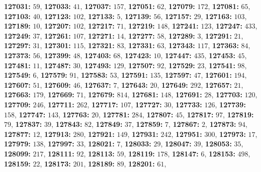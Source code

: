 \textsf{\bfseries 127031:} $59$, \textsf{\bfseries 127033:} $41$, \textsf{\bfseries 127037:} $157$, \textsf{\bfseries 127051:} $62$, \textsf{\bfseries 127079:} $172$, \textsf{\bfseries 127081:} $65$, \textsf{\bfseries 127103:} $40$, \textsf{\bfseries 127123:} $102$, \textsf{\bfseries 127133:} $5$, \textsf{\bfseries 127139:} $56$, \textsf{\bfseries 127157:} $29$, \textsf{\bfseries 127163:} $103$, \textsf{\bfseries 127189:} $10$, \textsf{\bfseries 127207:} $102$, \textsf{\bfseries 127217:} $71$, \textsf{\bfseries 127219:} $148$, \textsf{\bfseries 127241:} $123$, \textsf{\bfseries 127247:} $433$, \textsf{\bfseries 127249:} $37$, \textsf{\bfseries 127261:} $107$, \textsf{\bfseries 127271:} $14$, \textsf{\bfseries 127277:} $58$, \textsf{\bfseries 127289:} $3$, \textsf{\bfseries 127291:} $21$, \textsf{\bfseries 127297:} $31$, \textsf{\bfseries 127301:} $115$, \textsf{\bfseries 127321:} $83$, \textsf{\bfseries 127331:} $63$, \textsf{\bfseries 127343:} $117$, \textsf{\bfseries 127363:} $84$, \textsf{\bfseries 127373:} $56$, \textsf{\bfseries 127399:} $48$, \textsf{\bfseries 127403:} $68$, \textsf{\bfseries 127423:} $10$, \textsf{\bfseries 127447:} $435$, \textsf{\bfseries 127453:} $45$, \textsf{\bfseries 127481:} $11$, \textsf{\bfseries 127487:} $30$, \textsf{\bfseries 127493:} $129$, \textsf{\bfseries 127507:} $92$, \textsf{\bfseries 127529:} $23$, \textsf{\bfseries 127541:} $98$, \textsf{\bfseries 127549:} $6$, \textsf{\bfseries 127579:} $91$, \textsf{\bfseries 127583:} $53$, \textsf{\bfseries 127591:} $135$, \textsf{\bfseries 127597:} $47$, \textsf{\bfseries 127601:} $194$, \textsf{\bfseries 127607:} $51$, \textsf{\bfseries 127609:} $46$, \textsf{\bfseries 127637:} $7$, \textsf{\bfseries 127643:} $20$, \textsf{\bfseries 127649:} $292$, \textsf{\bfseries 127657:} $21$, \textsf{\bfseries 127663:} $179$, \textsf{\bfseries 127669:} $71$, \textsf{\bfseries 127679:} $814$, \textsf{\bfseries 127681:} $148$, \textsf{\bfseries 127691:} $28$, \textsf{\bfseries 127703:} $120$, \textsf{\bfseries 127709:} $246$, \textsf{\bfseries 127711:} $262$, \textsf{\bfseries 127717:} $107$, \textsf{\bfseries 127727:} $30$, \textsf{\bfseries 127733:} $126$, \textsf{\bfseries 127739:} $158$, \textsf{\bfseries 127747:} $143$, \textsf{\bfseries 127763:} $20$, \textsf{\bfseries 127781:} $284$, \textsf{\bfseries 127807:} $45$, \textsf{\bfseries 127817:} $97$, \textsf{\bfseries 127819:} $79$, \textsf{\bfseries 127837:} $39$, \textsf{\bfseries 127843:} $82$, \textsf{\bfseries 127849:} $37$, \textsf{\bfseries 127859:} $7$, \textsf{\bfseries 127867:} $2$, \textsf{\bfseries 127873:} $94$, \textsf{\bfseries 127877:} $12$, \textsf{\bfseries 127913:} $280$, \textsf{\bfseries 127921:} $149$, \textsf{\bfseries 127931:} $242$, \textsf{\bfseries 127951:} $300$, \textsf{\bfseries 127973:} $17$, \textsf{\bfseries 127979:} $138$, \textsf{\bfseries 127997:} $33$, \textsf{\bfseries 128021:} $7$, \textsf{\bfseries 128033:} $29$, \textsf{\bfseries 128047:} $39$, \textsf{\bfseries 128053:} $35$, \textsf{\bfseries 128099:} $217$, \textsf{\bfseries 128111:} $92$, \textsf{\bfseries 128113:} $59$, \textsf{\bfseries 128119:} $178$, \textsf{\bfseries 128147:} $6$, \textsf{\bfseries 128153:} $498$, \textsf{\bfseries 128159:} $22$, \textsf{\bfseries 128173:} $201$, \textsf{\bfseries 128189:} $89$, \textsf{\bfseries 128201:} $61$, 
